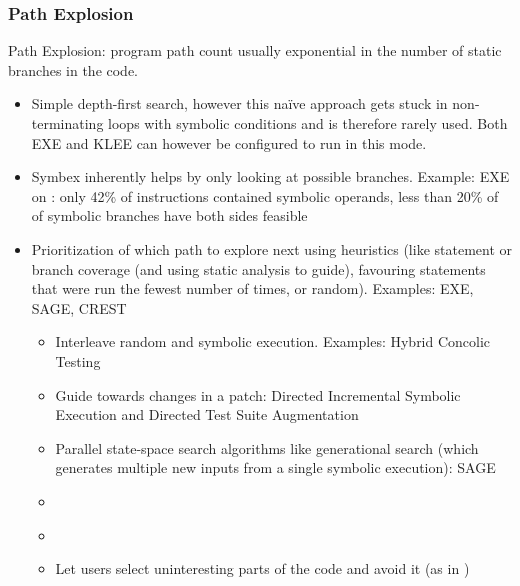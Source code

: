 \documentclass{article}
\begin{document}
\begin{multicols}{2}
    \subsubsection{Path Explosion}
    Path Explosion: program path count usually exponential in the number of static branches in the code.
    \begin{itemize}
        \item Simple depth-first search, however this naïve approach gets stuck in non-terminating loops with symbolic conditions and is therefore rarely used. Both EXE\cite{EXE} and KLEE\cite{KLEE} can however be configured to run in this mode.
        \item Symbex inherently helps by only looking at possible branches. Example: EXE\cite{EXE} on : only 42\% of instructions contained symbolic operands, less than 20\% of of symbolic branches have both sides feasible\cite{EXE}
        \item Prioritization of which path to explore next using heuristics (like statement or branch coverage (and using static analysis to guide), favouring statements that were run the fewest number of times, or random). Examples: EXE\cite{EXE}, SAGE\cite{SAGE}, CREST\cite{CREST}
              \begin{itemize}
                  \item Interleave random and symbolic execution. Examples: Hybrid Concolic Testing\cite{HCT, Driller, Cyberdyne}
                  \item Guide towards changes in a patch: Directed Incremental Symbolic Execution\cite{DiSE} and Directed Test Suite Augmentation\cite{DTSA}
                  \item Parallel state-space search algorithms like generational search (which generates multiple new inputs from a single symbolic execution): SAGE\cite{SAGE}
                  \item {}\cite{ReviewThreeDecades}
                  \item {}\cite{Fitnex}
                  \item Let users select uninteresting parts of the code and avoid it (as in \cite{Chopped})

\end{itemize}
\end{itemize}
\end{multicols}
\end{document}
